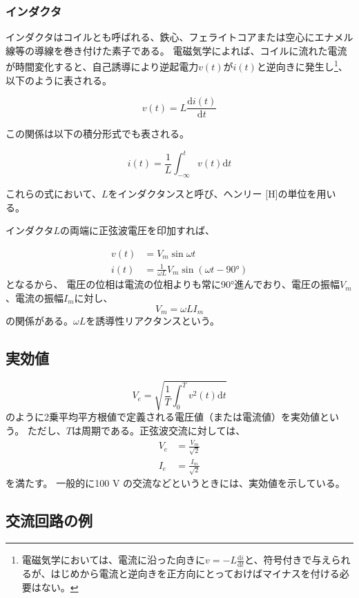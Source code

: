 \documentclass{ltjsreport}
\newcommand{\diff}{\mathrm{d}}
\newcommand{\dft}[1]{\frac{\mathrm{d}#1}{\mathrm{d}t}}
\begin{document}
\subsubsection{インダクタ}
インダクタはコイルとも呼ばれる、鉄心、フェライトコアまたは空心にエナメル線等の導線を巻き付けた素子である。
電磁気学によれば、コイルに流れた電流が時間変化すると、自己誘導により逆起電力$v(t)$が$i(t)$と逆向きに発生し\footnote{電磁気学においては、電流に沿った向きに$v = -L\dft{i}$と、符号付きで与えられるが、はじめから電流と逆向きを正方向にとっておけばマイナスを付ける必要はない。}、以下のように表される。


\begin{equation}
  v(t) = L \dft{i(t)}
\end{equation}

この関係は以下の積分形式でも表される。

\begin{equation}
  i(t) = \frac{1}{L}\int_{-\infty}^{t} v(t)\diff t
\end{equation}

これらの式において、$L$をインダクタンスと呼び、ヘンリー [H]の単位を用いる。

インダクタ$L$の両端に正弦波電圧を印加すれば、


\begin{align}
  v(t) &= V_m \sin \omega t\\
  i(t) &= \frac{1}{\omega L} V_m \sin(\omega t - \ang{90})
\end{align}
となるから、
電圧の位相は電流の位相よりも常に\ang{90}進んでおり、電圧の振幅$V_m$、電流の振幅$I_m$に対し、
\[
  V_m = \omega L I_m
\]
の関係がある。$\omega L$を誘導性リアクタンスという。

\subsection{実効値}

\[
  V_e = \sqrt{\frac{1}{T}\int_{0}^{T} v^2(t) \diff t}
\]
のように2乗平均平方根値で定義される電圧値（または電流値）を実効値という。
ただし、$T$は周期である。正弦波交流に対しては、
\begin{align}
  V_e &= \frac{V_m}{\sqrt{2}}\\
  I_e &= \frac{I_m}{\sqrt{2}}
\end{align}
を満たす。
一般的に100 V の交流などというときには、実効値を示している。

\newcommand{\vsin}{V_m \sin\omega t}
\newcommand{\isin}{I_m \sin(\omega t + \theta)}
\subsection{交流回路の例}
\newcommand{\wL}{\omega L}
\newcommand{\wC}{\omega C}
\end{document}
